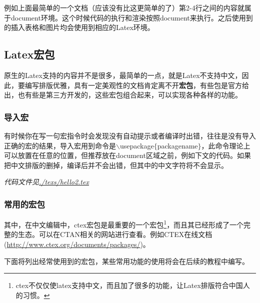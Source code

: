\documentclass{article}
\begin{document}
        例如上面最简单的一个文档（应该没有比这更简单的了）第2-4行之间的内容就属于document环境。这个时候代码的执行和渲染按照document来执行。之后使用到的插入表格和图片均会使用到相应的Latex环境。

        \subsection{Latex宏包}
        原生的Latex支持的内容并不是很多，最简单的一点，就是Latex不支持中文，因此，要编写排版优雅，具有一定美观性的文档肯定离不开\textbf{宏包}，有些包是官方给出，也有些是第三方开发的，这些宏包组合起来，可以实现各种各样的功能。

        \subsubsection{导入宏}
            有时候你在写一句宏指令时会发现没有自动提示或者编译时出错，往往是没有导入正确的宏的结果，导入宏用到命令是$\backslash$usepackage$\lbrace$packagename$\rbrace$，此命令理论上可以放置在任意的位置，但推荐放在document区域之前，例如下文的代码。如果把中文排版的删掉，编译后并不会出错，但其中的中文字符将不会显示。

            
            \textit{代码文件见\url{./texs/hello2.tex}}

        \subsubsection{常用的宏包}
            其中，在中文编辑中，ctex宏包是最重要的一个宏包\footnote{ctex不仅仅使latex支持中文，而且加了很多的功能，让Latex排版符合中国人的习惯。}，而且其已经形成了一个完整的生态。可以在CTAN相关的网站进行查看。例如CTEX在线文档(\url{http://www.ctex.org/documents/packages/})。

            下面将列出经常使用到的宏包，某些常用功能的使用将会在后续的教程中编写。
\end{document}
